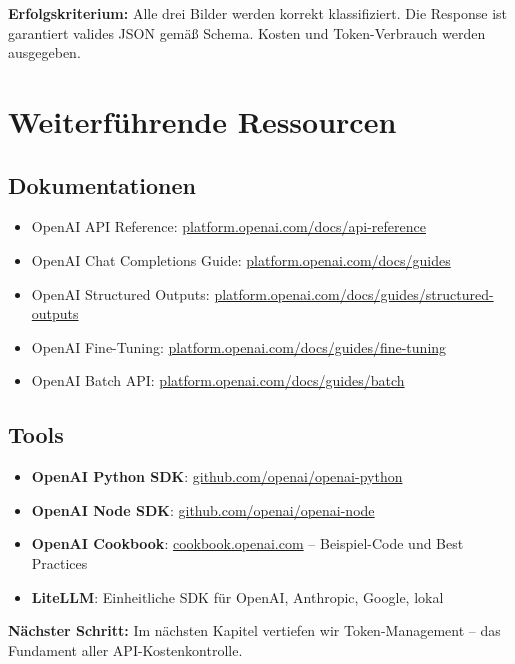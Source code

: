 \textbf{Erfolgskriterium:} Alle drei Bilder werden korrekt klassifiziert. Die Response ist garantiert valides JSON gemäß Schema. Kosten und Token-Verbrauch werden ausgegeben.

\section{Weiterführende Ressourcen}

\subsection{Dokumentationen}
\begin{itemize}[leftmargin=*]
    \item OpenAI API Reference: \href{https://platform.openai.com/docs/api-reference}{platform.openai.com/docs/api-reference}
    \item OpenAI Chat Completions Guide: \href{https://platform.openai.com/docs/guides/chat-completions}{platform.openai.com/docs/guides}
    \item OpenAI Structured Outputs: \href{https://platform.openai.com/docs/guides/structured-outputs}{platform.openai.com/docs/guides/structured-outputs}
    \item OpenAI Fine-Tuning: \href{https://platform.openai.com/docs/guides/fine-tuning}{platform.openai.com/docs/guides/fine-tuning}
    \item OpenAI Batch API: \href{https://platform.openai.com/docs/guides/batch}{platform.openai.com/docs/guides/batch}
\end{itemize}

\subsection{Tools}
\begin{itemize}[leftmargin=*]
    \item \textbf{OpenAI Python SDK}: \href{https://github.com/openai/openai-python}{github.com/openai/openai-python}
    \item \textbf{OpenAI Node SDK}: \href{https://github.com/openai/openai-node}{github.com/openai/openai-node}
    \item \textbf{OpenAI Cookbook}: \href{https://cookbook.openai.com}{cookbook.openai.com} -- Beispiel-Code und Best Practices
    \item \textbf{LiteLLM}: Einheitliche SDK für OpenAI, Anthropic, Google, lokal
\end{itemize}

\textbf{Nächster Schritt:} Im nächsten Kapitel vertiefen wir Token-Management -- das Fundament aller API-Kostenkontrolle.
\endinput

\clearpage

